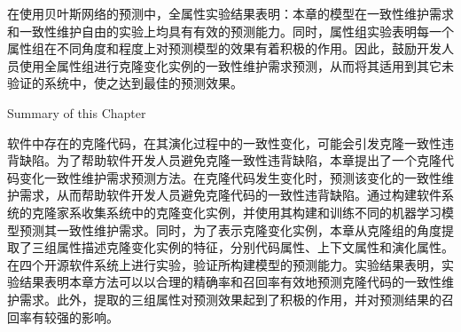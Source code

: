 在使用贝叶斯网络的预测中，全属性实验结果表明：本章的模型在一致性维护需求和一致性维护自由的实验上均具有有效的预测能力。同时，属性组实验表明每一个属性组在不同角度和程度上对预测模型的效果有着积极的作用。因此，鼓励开发人员使用全属性组进行克隆变化实例的一致性维护需求预测，从而将其适用到其它未验证的系统中，使之达到最佳的预测效果。

{Summary of this Chapter}

软件中存在的克隆代码，在其演化过程中的一致性变化，可能会引发克隆一致性违背缺陷。为了帮助软件开发人员避免克隆一致性违背缺陷，本章提出了一个克隆代码变化一致性维护需求预测方法。在克隆代码发生变化时，预测该变化的一致性维护需求，从而帮助软件开发人员避免克隆代码的一致性违背缺陷。通过构建软件系统的克隆家系收集系统中的克隆变化实例，并使用其构建和训练不同的机器学习模型预测其一致性维护需求。同时，为了表示克隆变化实例，本章从克隆组的角度提取了三组属性描述克隆变化实例的特征，分别代码属性、上下文属性和演化属性。在四个开源软件系统上进行实验，验证所构建模型的预测能力。实验结果表明，实验结果表明本章方法可以以合理的精确率和召回率有效地预测克隆代码的一致性维护需求。此外，提取的三组属性对预测效果起到了积极的作用，并对预测结果的召回率有较强的影响。

